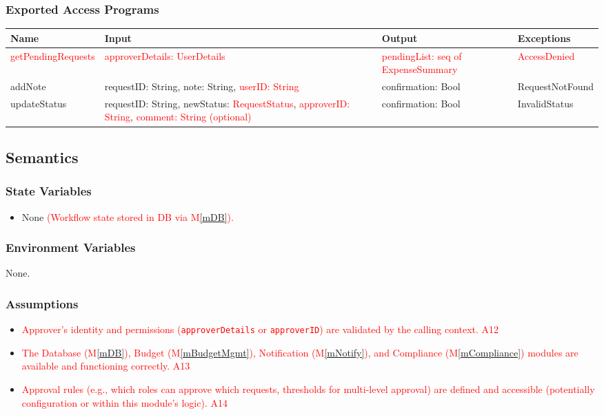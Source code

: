 \documentclass[12pt, titlepage]{article}
\providecommand{\mref}[1]{M\ref{#1}}
\begin{document}
\subsubsection{Exported Access Programs}
\begin{center}
    \scriptsize
    \begin{tabular}{|p{3cm}|p{4cm}|p{4cm}|p{4cm}|} %
        \hline
        \textbf{Name} & \textbf{Input} & \textbf{Output} & \textbf{Exceptions} \\
        \hline
        \textcolor{red}{getPendingRequests} & \textcolor{red}{approverDetails: UserDetails} & \textcolor{red}{pendingList: seq of ExpenseSummary} & \textcolor{red}{AccessDenied} \\
        \hline
        addNote & requestID: String, note: String, \textcolor{red}{userID: String} & confirmation: Bool & RequestNotFound \\
        \hline
        updateStatus & requestID: String, newStatus: \textcolor{red}{RequestStatus}, \textcolor{red}{approverID: String}, \textcolor{red}{comment: String (optional)} & confirmation: Bool & InvalidStatus \\
        \hline
    \end{tabular}
\end{center}

\subsection{Semantics}
\subsubsection{State Variables}
\begin{itemize}
    \item None \textcolor{red}{(Workflow state stored in DB via \mref{mDB}).}
\end{itemize}

\subsubsection{Environment Variables}
None. %

\subsubsection{Assumptions}
\begin{itemize}
    \item \textcolor{red}{Approver's identity and permissions (\texttt{approverDetails} or \texttt{approverID}) are validated by the calling context. A12}
    \item \textcolor{red}{The Database (\mref{mDB}), Budget (\mref{mBudgetMgmt}), Notification (\mref{mNotify}), and Compliance (\mref{mCompliance}) modules are available and functioning correctly. A13}
    \item \textcolor{red}{Approval rules (e.g., which roles can approve which requests, thresholds for multi-level approval) are defined and accessible (potentially configuration or within this module's logic). A14}
\end{itemize}
\end{document}
